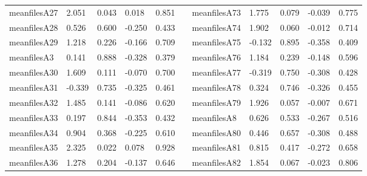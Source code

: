 \begin{table}[h!]
\begin{tabular}{lllllllllll}
meanfilesA27  & 2.051            & 0.043            & 0.018            & 0.851            &           & meanfilesA73  & 1.775            & 0.079            & -0.039           & 0.775            \\
meanfilesA28  & 0.526            & 0.600            & -0.250           & 0.433            &           & meanfilesA74  & 1.902            & 0.060            & -0.012           & 0.714            \\
meanfilesA29  & 1.218            & 0.226            & -0.166           & 0.709            &           & meanfilesA75  & -0.132           & 0.895            & -0.358           & 0.409            \\
meanfilesA3   & 0.141            & 0.888            & -0.328           & 0.379            &           & meanfilesA76  & 1.184            & 0.239            & -0.148           & 0.596            \\
meanfilesA30  & 1.609            & 0.111            & -0.070           & 0.700            &           & meanfilesA77  & -0.319           & 0.750            & -0.308           & 0.428            \\
meanfilesA31  & -0.339           & 0.735            & -0.325           & 0.461            &           & meanfilesA78  & 0.324            & 0.746            & -0.326           & 0.455            \\
meanfilesA32  & 1.485            & 0.141            & -0.086           & 0.620            &           & meanfilesA79  & 1.926            & 0.057            & -0.007           & 0.671            \\
meanfilesA33  & 0.197            & 0.844            & -0.353           & 0.432            &           & meanfilesA8   & 0.626            & 0.533            & -0.267           & 0.516            \\
meanfilesA34  & 0.904            & 0.368            & -0.225           & 0.610            &           & meanfilesA80  & 0.446            & 0.657            & -0.308           & 0.488            \\
meanfilesA35  & 2.325            & 0.022            & 0.078            & 0.928            &           & meanfilesA81  & 0.815            & 0.417            & -0.272           & 0.658            \\
meanfilesA36  & 1.278            & 0.204            & -0.137           & 0.646            &           & meanfilesA82  & 1.854            & 0.067            & -0.023           & 0.806            \\

\end{tabular}
\end{table}
